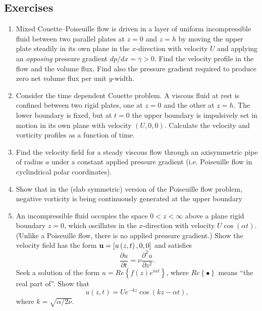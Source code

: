 \documentclass[twoside,a4paper,11pt]{report}
\begin{document}
\subsection*{Exercises}
\begin{enumerate}
\item Mixed Couette--Poiseuille flow is driven in a layer of uniform 
incompressible fluid between two parallel plates at $z = 0$ and $z = h$ by 
moving the upper plate steadily in its own plane in the $x$-direction with 
velocity $U$ and applying an \textit{opposing} pressure gradient ${dp} /  {dx}=\gamma >0$. 
Find the velocity profile in the flow and the volume flux. Find also the 
pressure gradient required to produce zero net volume flux per unit $y$-width.

\item Consider the time dependent Couette problem. A viscous fluid at rest is 
confined between two rigid plates, one at $z = 0$ and the other at $z = h$. The 
lower boundary is fixed, but at $t = 0$ the upper boundary is impulsively set 
in motion in its own plane with velocity $(U,0,0)$. Calculate the velocity and 
vorticity profiles as a function of time. 

\item Find the velocity field for a steady viscous flow through an
axisymmetric pipe of radius $a$ under a constant applied pressure gradient
(i.e. Poiseuille flow in cyclindrical polar coordinates).

\item Show that in the (slab symmetric) version of the Poiseuille flow problem, 
negative vorticity is being continuously generated at the upper boundary 

\item An incompressible fluid occupies the space $0<z<\infty $ above a plane 
rigid boundary $z = 0$, which oscillates in the $x$-direction with 
velocity $U\cos \left( {\alpha t} \right)$. (Unlike a Poiseuille flow, there 
is no applied pressure gradient.) Show the velocity field has the form ${\rm 
{\bf u}}=\left[ {u\left( {z,t} \right),0,0} \right]$ and satisfies 
\[ \frac{\partial u}{\partial t}=\nu \frac{\partial ^2u}{\partial z^2}. \]
 Seek 
a solution of the form $u=Re\left\{ {f\left( z \right)e^{i\alpha t}} 
\right\}$, where $Re\left\{ \bullet \right\}$ means ``the real part of''. 
Show that 
\[ u(z,t)=Ue^{-kz}\cos \left( {kz-\alpha t} \right), \]
 where $k=\sqrt 
{\alpha / {2\nu }} $.

\end{enumerate}
\end{document}
